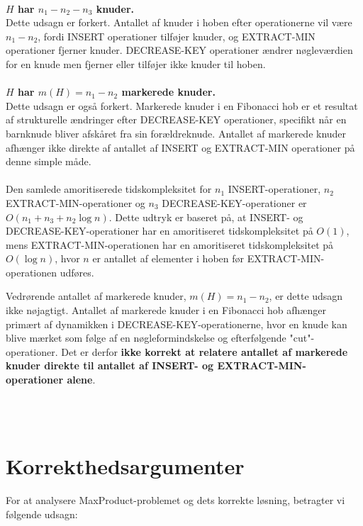 \documentclass{article}
\begin{document}
\\
\textbf{$H$ har $n_1-n_2-n_3$ knuder.} 
\\
Dette udsagn er forkert. Antallet af knuder i hoben efter operationerne vil være $n_1-n_2$, fordi INSERT operationer tilføjer knuder, og EXTRACT-MIN operationer fjerner knuder. DECREASE-KEY operationer ændrer nøgleværdien for en knude men fjerner eller tilføjer ikke knuder til hoben.
\\
\\
\textbf{$H$ har $m(H)=n_1-n_2$ markerede knuder.} 
\\
Dette udsagn er også forkert. Markerede knuder i en Fibonacci hob er et resultat af strukturelle ændringer efter DECREASE-KEY operationer, specifikt når en barnknude bliver afskåret fra sin forældreknude. Antallet af markerede knuder afhænger ikke direkte af antallet af INSERT og EXTRACT-MIN operationer på denne simple måde.
\\
\\
Den samlede amoritiserede tidskompleksitet for $n_1$ INSERT-operationer, $n_2$ EXTRACT-MIN-operationer og $n_3$ DECREASE-KEY-operationer er $O(n_1 + n_3 + n_2 \log n)$. Dette udtryk er baseret på, at INSERT- og DECREASE-KEY-operationer har en amoritiseret tidskompleksitet på $O(1)$, mens EXTRACT-MIN-operationen har en amoritiseret tidskompleksitet på $O(\log n)$, hvor $n$ er antallet af elementer i hoben før EXTRACT-MIN-operationen udføres.

Vedrørende antallet af markerede knuder, $m(H)=n_1-n_2$, er dette udsagn ikke nøjagtigt. Antallet af markerede knuder i en Fibonacci hob afhænger primært af dynamikken i DECREASE-KEY-operationerne, hvor en knude kan blive mærket som følge af en nøgleformindskelse og efterfølgende "cut"-operationer. Det er derfor \textbf{ikke korrekt at relatere antallet af markerede knuder direkte til antallet af INSERT- og EXTRACT-MIN-operationer alene}.

\\
\\


\section{Korrekthedsargumenter}
For at analysere MaxProduct-problemet og dets korrekte løsning, betragter vi følgende udsagn:
\end{document}
